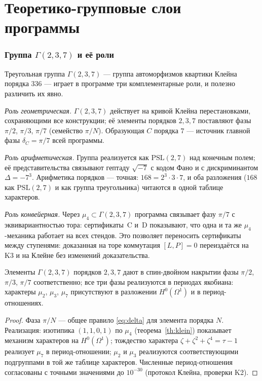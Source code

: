 \part{Теоретико-групповые слои программы}

\section{Группа $\Gamma(2,3,7)$ и её роли}\label{sec:gamma237}

Треугольная группа $\Gamma(2,3,7)$ --- группа автоморфизмов
квартики Клейна порядка $336$ --- играет в программе три
комплементарные роли, и полезно различить их явно.

\emph{Роль геометрическая.} $\Gamma(2,3,7)$ действует на кривой
Клейна перестановками, сохраняющими все конструкции; её элементы
порядков $2,3,7$ поставляют фазы $\pi/2$, $\pi/3$, $\pi/7$
(семейство $\pi/N$). Образующая $C$ порядка $7$ --- источник
главной фазы $\delta_C=\pi/7$ всей программы.

\emph{Роль арифметическая.} Группа реализуется как
$\mathrm{PSL}(2,7)$ над конечным полем; её представительства
связывают гептаду $\sqrt{-7}$ с кодом Фано и с дискриминантом
$\Delta=-7^3$. Арифметика порядков --- точная: $168=2^3\cdot3\cdot7$,
и оба разложения ($168$ как $\mathrm{PSL}(2,7)$ и как группа
треугольника) читаются в одной таблице характеров.

\emph{Роль конвейерная.} Через $\mu_4\subset\Gamma(2,3,7)$
программа связывает фазу $\pi/7$ с эквивариантностью тора:
сертификаты~C и~D показывают, что одна и та же $\mu_4$-механика
работает на всех стендов. Это позволяет переносить сертификаты
между ступенями: доказанная на торе коммутация $[L,P]=0$
переиздаётся на K3 и на Клейне без изменений доказательства.

\begin{proposition}\label{prop:threeorders}
Элементы $\Gamma(2,3,7)$ порядков $2,3,7$ дают в спин-двойном
накрытии фазы $\pi/2$, $\pi/3$, $\pi/7$ соответственно; все три
фазы реализуются в периодах якобиана: характеры $\mu_2$, $\mu_3$,
$\mu_7$ присутствуют в разложении $H^0(\Omega^1)$ и в
период-отношениях.
\end{proposition}

\begin{proof}
Фаза $\pi/N$ --- общее правило \eqref{eq:delta} для элемента
порядка $N$. Реализация: изотипика $(1,1,0,1)$ по $\mu_4$
(теорема~\ref{th:klein}) показывает механизм характеров на
$H^0(\Omega^1)$; тождество характера $\zeta+\zeta^2+\zeta^4=
\tau-1$ реализует $\mu_7$ в период-отношении; $\mu_2$ и $\mu_3$
реализуются соответствующими подгруппами в той же таблице
характеров. Численные период-отношения согласованы с точными
значениями до $10^{-30}$ (протокол Клейна, проверки K2).
\end{proof}

